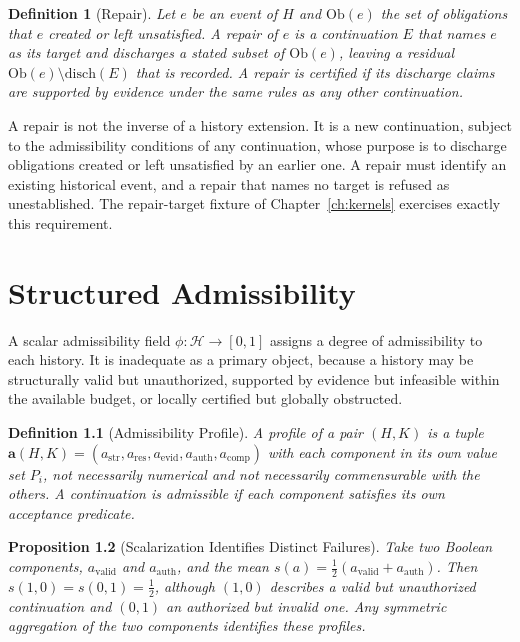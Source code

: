 \documentclass[12pt,oneside,openany]{book}
\theoremstyle{spherepop}
\newtheorem{definition}{Definition}[chapter]
\newtheorem{proposition}[definition]{Proposition}
\theoremstyle{remarkstyle}
\newcommand{\calH}{\mathcal{H}}
\begin{document}
\begin{definition}[Repair]
Let $e$ be an event of $H$ and $\mathrm{Ob}(e)$ the set of obligations that $e$ created or left unsatisfied. A \emph{repair} of $e$ is a continuation $E$ that names $e$ as its target and discharges a stated subset of $\mathrm{Ob}(e)$, leaving a residual $\mathrm{Ob}(e)\setminus\mathrm{disch}(E)$ that is recorded. A repair is \emph{certified} if its discharge claims are supported by evidence under the same rules as any other continuation.
\end{definition}

A repair is not the inverse of a history extension. It is a new continuation, subject to the admissibility conditions of any continuation, whose purpose is to discharge obligations created or left unsatisfied by an earlier one. A repair must identify an existing historical event, and a repair that names no target is refused as unestablished. The repair-target fixture of Chapter~\ref{ch:kernels} exercises exactly this requirement.

\chapter{Structured Admissibility}
\label{ch:structured}

A scalar admissibility field $\phi:\calH\to[0,1]$ assigns a degree of admissibility to each history. It is inadequate as a primary object, because a history may be structurally valid but unauthorized, supported by evidence but infeasible within the available budget, or locally certified but globally obstructed.

\begin{definition}[Admissibility Profile]
A \emph{profile} of a pair $(H,K)$ is a tuple $\mathbf a(H,K)=(a_{\mathrm{str}},a_{\mathrm{res}},a_{\mathrm{evid}},a_{\mathrm{auth}},a_{\mathrm{comp}})$ with each component in its own value set $P_i$, not necessarily numerical and not necessarily commensurable with the others. A continuation is \emph{admissible} if each component satisfies its own acceptance predicate.
\end{definition}

\begin{proposition}[Scalarization Identifies Distinct Failures]
Take two Boolean components, $a_{\mathrm{valid}}$ and $a_{\mathrm{auth}}$, and the mean $s(a)=\tfrac12(a_{\mathrm{valid}}+a_{\mathrm{auth}})$. Then $s(1,0)=s(0,1)=\tfrac12$, although $(1,0)$ describes a valid but unauthorized continuation and $(0,1)$ an authorized but invalid one. Any symmetric aggregation of the two components identifies these profiles.
\end{proposition}
\end{document}

